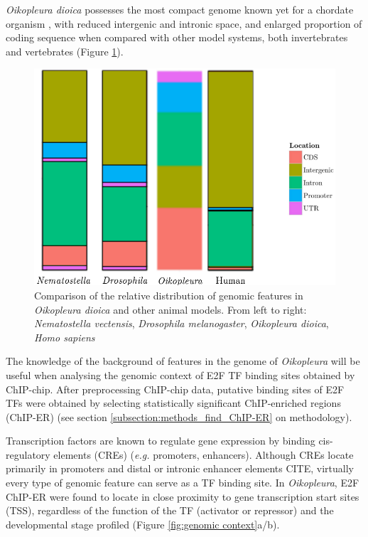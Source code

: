 \documentclass[11pt,twoside,a4paper]{report}
\begin{document}
		\textit{Oikopleura dioica} possesses the most compact genome known yet for a chordate organism \cite{Denoeud2010}, with reduced intergenic and intronic space, and enlarged proportion of coding sequence when compared with other model systems, both invertebrates and vertebrates (Figure \ref{fig:genome_background}).
	
		\begin{figure}[here]
			\setlength{\belowcaptionskip}{5pt}
			\centering
			\includegraphics[height=0.3\textwidth]{pngs/species_genome.png}
			\caption{Comparison of the relative distribution of genomic features in \textit{Oikopleura dioica} and other animal models.
			{\footnotesize
				From left to right:
					\textit{Nematostella vectensis},
					\textit{Drosophila melanogaster},
					\textit{Oikopleura dioica},
					\textit{Homo sapiens}
				}
			}
			\label{fig:genome_background}
		\end{figure}
		
		The knowledge of the background of features in the genome of \textit{Oikopleura} will be useful when analysing the genomic context of E2F TF binding sites obtained by ChIP-chip. After preprocessing ChIP-chip data, putative binding sites of E2F TFs were obtained by selecting statistically significant ChIP-enriched regions (ChIP-ER) (see section \ref{subsection:methods_find_ChIP-ER} on methodology).
		
		Transcription factors are known to regulate gene expression by binding cis-regulatory elements (CREs) (\textit{e.g.} promoters, enhancers). Although CREs locate primarily in promoters and distal or intronic enhancer elements CITE, virtually every type of genomic feature can serve as a TF binding site. In \textit{Oikopleura}, E2F ChIP-ER were found to locate in close proximity to gene transcription start sites (TSS), regardless of the function of the TF (activator or repressor) and the developmental stage profiled (Figure \ref{fig:genomic context}a/b). 
				
\end{document}
